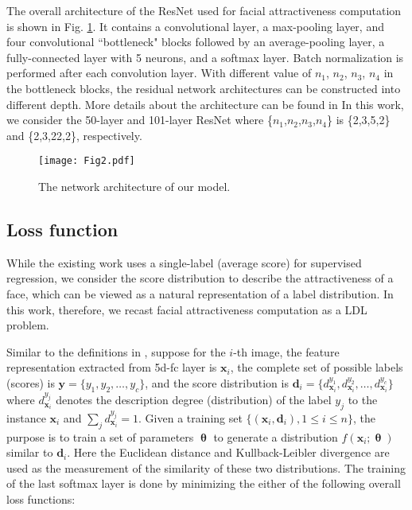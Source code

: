 \documentclass[preprint,5p,times,twocolumn]{elsarticle}
\begin{document}
The overall architecture of the ResNet used for facial attractiveness computation is shown in Fig. \ref{fig2}. It contains a convolutional layer, a max-pooling layer, and four convolutional ``bottleneck" blocks followed by an average-pooling layer, a fully-connected layer with 5 neurons, and a softmax layer. Batch normalization is performed after each convolution layer. With different value of $n_1$, $n_2$, $n_3$, $n_4$ in the bottleneck blocks, the residual network architectures can be constructed into different depth. More details about the architecture can be found in \cite{CVPR16_ResNet} In this work, we consider the 50-layer and 101-layer ResNet where \{$n_1$,$n_2$,$n_3$,$n_4$\} is \{2,3,5,2\} and \{2,3,22,2\}, respectively.


\begin{figure}[!h]
\centering
\texttt{[image: Fig2.pdf]}
\caption{The network architecture of our model.}
\label{fig2}
\end{figure}


\subsection{Loss function}
While the existing work uses a single-label (average score) for supervised regression, we consider the score distribution to describe the attractiveness of a face, which can be viewed as a natural representation of a label distribution. In this work, therefore, we recast facial attractiveness computation as a LDL problem.

Similar to the definitions in \cite{PAMI13_Geng}, suppose for the $i$-th image, the feature representation extracted from 5d-fc layer is $\mathbf{x}_i$, the complete set of possible labels (scores) is $\mathbf{y}=\{y_1,y_2,\ldots,y_c\}$, and the score distribution is $\mathbf{d}_i=\{d^{y_1}_{\mathbf{x}_i},d^{y_2}_{\mathbf{x}_i},\ldots,d^{y_c}_{\mathbf{x}_i}\}$ where $d^{y_j}_{\mathbf{x}_i}$ denotes the description degree (distribution) of the label $y_j$ to the instance $\mathbf{x}_i$ and $\sum_{j}{d^{y_j}_{\mathbf{x}_i}}=1$. Given a training set $\{(\mathbf{x}_i,\mathbf{d}_i),1\leq i \leq n\}$, the purpose is to train a set of parameters $\boldsymbol{\uptheta}$ to generate a distribution $f(\mathbf{x}_i;\boldsymbol{\uptheta})$ similar to $\mathbf{d}_i$. Here the Euclidean distance and Kullback-Leibler divergence are used as the measurement of the similarity of these two distributions. The training of the last softmax layer is done by minimizing the either of the following overall loss functions:
\end{document}
